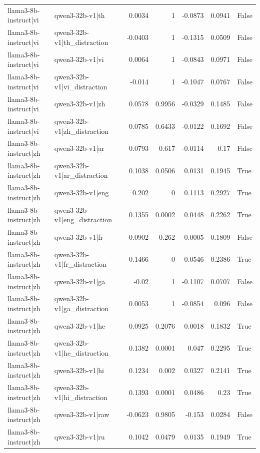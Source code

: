 \begin{table}
\begin{tabular}{l l r r r r l}
llama3-8b-instruct|vi & qwen3-32b-v1|th & 0.0034 & 1 & -0.0873 & 0.0941 & False \\
llama3-8b-instruct|vi & qwen3-32b-v1|th_distraction & -0.0403 & 1 & -0.1315 & 0.0509 & False \\
llama3-8b-instruct|vi & qwen3-32b-v1|vi & 0.0064 & 1 & -0.0843 & 0.0971 & False \\
llama3-8b-instruct|vi & qwen3-32b-v1|vi_distraction & -0.014 & 1 & -0.1047 & 0.0767 & False \\
llama3-8b-instruct|vi & qwen3-32b-v1|zh & 0.0578 & 0.9956 & -0.0329 & 0.1485 & False \\
llama3-8b-instruct|vi & qwen3-32b-v1|zh_distraction & 0.0785 & 0.6433 & -0.0122 & 0.1692 & False \\
llama3-8b-instruct|zh & qwen3-32b-v1|ar & 0.0793 & 0.617 & -0.0114 & 0.17 & False \\
llama3-8b-instruct|zh & qwen3-32b-v1|ar_distraction & 0.1038 & 0.0506 & 0.0131 & 0.1945 & True \\
llama3-8b-instruct|zh & qwen3-32b-v1|eng & 0.202 & 0 & 0.1113 & 0.2927 & True \\
llama3-8b-instruct|zh & qwen3-32b-v1|eng_distraction & 0.1355 & 0.0002 & 0.0448 & 0.2262 & True \\
llama3-8b-instruct|zh & qwen3-32b-v1|fr & 0.0902 & 0.262 & -0.0005 & 0.1809 & False \\
llama3-8b-instruct|zh & qwen3-32b-v1|fr_distraction & 0.1466 & 0 & 0.0546 & 0.2386 & True \\
llama3-8b-instruct|zh & qwen3-32b-v1|ga & -0.02 & 1 & -0.1107 & 0.0707 & False \\
llama3-8b-instruct|zh & qwen3-32b-v1|ga_distraction & 0.0053 & 1 & -0.0854 & 0.096 & False \\
llama3-8b-instruct|zh & qwen3-32b-v1|he & 0.0925 & 0.2076 & 0.0018 & 0.1832 & True \\
llama3-8b-instruct|zh & qwen3-32b-v1|he_distraction & 0.1382 & 0.0001 & 0.047 & 0.2295 & True \\
llama3-8b-instruct|zh & qwen3-32b-v1|hi & 0.1234 & 0.002 & 0.0327 & 0.2141 & True \\
llama3-8b-instruct|zh & qwen3-32b-v1|hi_distraction & 0.1393 & 0.0001 & 0.0486 & 0.23 & True \\
llama3-8b-instruct|zh & qwen3-32b-v1|raw & -0.0623 & 0.9805 & -0.153 & 0.0284 & False \\
llama3-8b-instruct|zh & qwen3-32b-v1|ru & 0.1042 & 0.0479 & 0.0135 & 0.1949 & True \\

\end{tabular}
\end{table}
